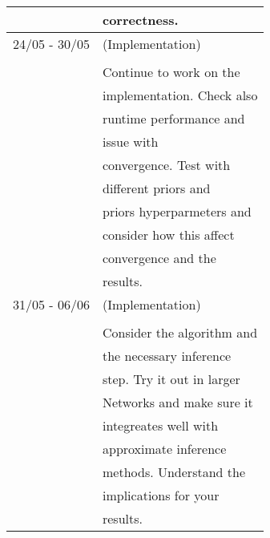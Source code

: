\documentclass[a4paper]{article}
\begin{document}
\begin{center}
\begin{tabular}{|l|l|}
 & correctness. \\
\hline
24/05 - 30/05 & (Implementation) \\
 & \\
 & Continue to work on the \\
 & implementation. Check also \\
 & runtime performance and \\
 & issue with \\
 & convergence. Test with \\
 & different priors and \\
 & priors hyperparmeters and \\
 & consider how this affect \\
 & convergence and the \\
 & results. \\
\hline
31/05 - 06/06 & (Implementation) \\
 & \\
 & Consider the algorithm and \\
 & the necessary inference \\
 & step. Try it out in larger \\
 & Networks and make sure it \\
 & integreates well with \\
 & approximate inference \\
 & methods. Understand the \\
 & implications for your \\
 & results. \\
\hline
\end{tabular}
\end{center}


\newpage
\end{document}
